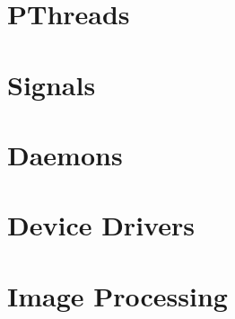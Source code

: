 \section{PThreads}
\section{Signals}



\section{Daemons}


\section{Device Drivers}


\section{Image Processing}